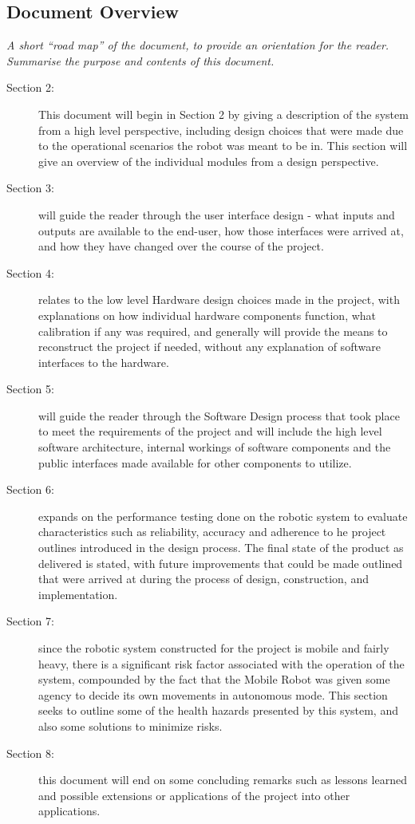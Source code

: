 \subsection{Document Overview}
  \textit{A short “road map” of the document, to provide an orientation for the reader. Summarise the purpose and contents of this document.}
  \begin{description}
    \item[Section 2:]
      This document will begin in Section 2 by giving a description of the system from a high level perspective, including design choices that were made due to the operational scenarios the robot was meant to be in. This section will give an overview of the individual modules from a design perspective.
    \item[Section 3:]
      will guide the reader through the user interface design - what inputs and outputs are available to the end-user, how those interfaces were arrived at, and how they have changed over the course of the project.
    \item[Section 4:]
      relates to the low level Hardware design choices made in the project, with explanations on how individual hardware components function, what calibration if any was required, and generally will provide the means to reconstruct the project if needed, without any explanation of software interfaces to the hardware.
    \item[Section 5:]
      will guide the reader through the Software Design process that took place to meet the requirements of the project and will include the high level software architecture, internal workings of software components and the public interfaces made available for other components to utilize.
    \item[Section 6:]
      expands on the performance testing done on the robotic system to evaluate characteristics such as reliability, accuracy and adherence to he project outlines introduced in the design process. The final state of the product as delivered is stated, with future improvements that could be made outlined that were arrived at during the process of design, construction, and implementation.
    \item[Section 7:]
      since the robotic system constructed for the project is mobile and fairly heavy, there is a significant risk factor associated with the operation of the system, compounded by the fact that the Mobile Robot was given some agency to decide its own movements in autonomous mode. This section seeks to outline some of the health hazards presented by this system, and also some solutions to minimize risks.
    \item[Section 8:]
      this document will end on some concluding remarks such as lessons learned and possible extensions or applications of the project into other applications.
    \end{description}
